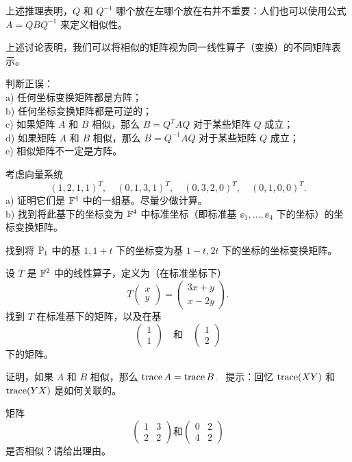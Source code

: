 上述推理表明，$Q$ 和 $Q^{-1}$ 哪个放在左哪个放在右并不重要：人们也可以使用公式 $A = QBQ^{-1}$ 来定义相似性。

上述讨论表明，我们可以将相似的矩阵视为同一线性算子（变换）的不同矩阵表示。

\begin{problemset}
\item \label{ex:02-08-01} 判断正误：
\\
a) 任何坐标变换矩阵都是方阵；
\\
b) 任何坐标变换矩阵都是可逆的；
\\
c) 如果矩阵 $A$ 和 $B$ 相似，那么 $B = Q^T A Q$ 对于某些矩阵 $Q$ 成立；
\\
d) 如果矩阵 $A$ 和 $B$ 相似，那么 $B = Q^{-1} A Q$ 对于某些矩阵 $Q$ 成立；
\\
e) 相似矩阵不一定是方阵。
\item \label{ex:02-08-02} 考虑向量系统
$$(1, 2, 1, 1)^T,\quad (0, 1, 3, 1)^T,\quad (0, 3, 2, 0)^T,\quad (0, 1, 0, 0)^T.$$
a) 证明它们是 $\mathbb{F}^4$ 中的一组基。尽量少做计算。
\\
b) 找到将此基下的坐标变为 $\mathbb{F}^4$ 中标准坐标（即标准基 $\ee_1, \dots, \ee_4$ 下的坐标）的坐标变换矩阵。
\item \label{ex:02-08-03} 找到将 $\mathbb{P}_1$ 中的基 $1, 1+t$ 下的坐标变为基 $1-t, 2t$ 下的坐标的坐标变换矩阵。
\item \label{ex:02-08-04} 设 $T$ 是 $\mathbb{F}^2$ 中的线性算子，定义为（在标准坐标下）
$$T\begin{pmatrix} x \\ y \end{pmatrix} = \begin{pmatrix} 3x + y \\ x - 2y \end{pmatrix}.$$
找到 $T$ 在标准基下的矩阵，以及在基 $$\begin{pmatrix} 1 \\ 1 \end{pmatrix}\quad \text{和}\quad \begin{pmatrix} 1 \\ 2 \end{pmatrix}$$
下的矩阵。
\item \label{ex:02-08-05} 证明，如果 $A$ 和 $B$ 相似，那么 $\operatorname{trace} A = \operatorname{trace} B$. ~{\heiti 提示}：回忆 $\operatorname{trace}(XY)$ 和 $\operatorname{trace}(YX)$ 是如何关联的。
\item \label{ex:02-08-06} 矩阵
$$\begin{pmatrix} 1 & 3 \\ 2 & 2 \end{pmatrix}\text{和}\begin{pmatrix} 0 & 2 \\ 4 & 2 \end{pmatrix}$$
 是否相似？请给出理由。

\end{problemset}


